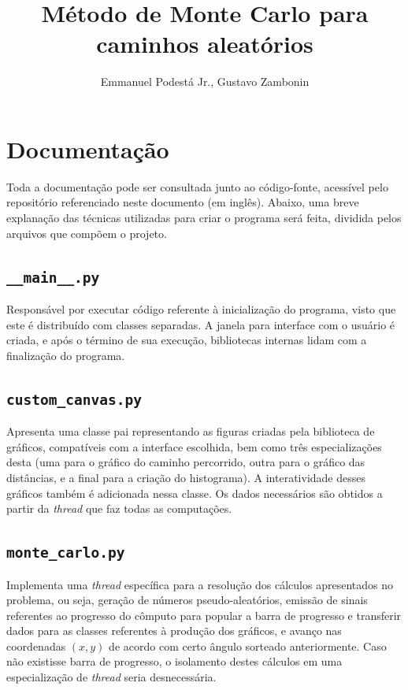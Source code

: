 \documentclass{sftex/sftex}
\title{Método de Monte Carlo para caminhos aleatórios}
\author{Emmanuel Podestá Jr., Gustavo Zambonin}
\begin{document}
\maketitle

\section{Documentação}

Toda a documentação pode ser consultada junto ao código-fonte, acessível pelo
repositório referenciado neste documento (em inglês). Abaixo, uma breve
explanação das técnicas utilizadas para criar o programa será feita, dividida
pelos arquivos que compõem o projeto.

\subsection{\texttt{\_\_main\_\_.py}}

Responsável por executar código referente à inicialização do programa, visto
que este é distribuído com classes separadas. A janela para interface com o
usuário é criada, e após o término de sua execução, bibliotecas internas lidam
com a finalização do programa.

\subsection{\texttt{custom\_canvas.py}}

Apresenta uma classe pai representando as figuras criadas pela biblioteca de
gráficos, compatíveis com a interface escolhida, bem como três especializações
desta (uma para o gráfico do caminho percorrido, outra para o gráfico das
distâncias, e a final para a criação do histograma). A interatividade desses
gráficos também é adicionada nessa classe. Os dados necessários são obtidos a
partir da \emph{thread} que faz todas as computações.

\subsection{\texttt{monte\_carlo.py}}

Implementa uma \emph{thread} específica para a resolução dos cálculos
apresentados no problema, ou seja, geração de números pseudo-aleatórios,
emissão de sinais referentes ao progresso do cômputo para popular a barra de
progresso e transferir dados para as classes referentes à produção dos
gráficos, e avanço nas coordenadas $(x, y)$ de acordo com certo ângulo sorteado
anteriormente.  Caso não existisse barra de progresso, o isolamento destes
cálculos em uma especialização de \emph{thread} seria desnecessária.
\end{document}
